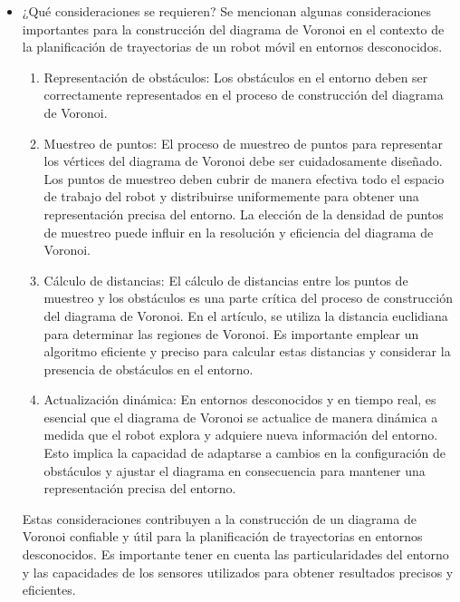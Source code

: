 \documentclass{article}
\begin{document}
\begin{itemize}
\item ¿Qué consideraciones se requieren?
  Se mencionan algunas consideraciones importantes para la construcción del diagrama de Voronoi en el contexto de la planificación de trayectorias de un robot móvil en entornos desconocidos.

  \begin{enumerate}
  
  \item Representación de obstáculos: Los obstáculos en el entorno deben ser correctamente representados en el proceso de construcción del diagrama de Voronoi. 
  \item Muestreo de puntos: El proceso de muestreo de puntos para representar los vértices del diagrama de Voronoi debe ser cuidadosamente diseñado. Los puntos de muestreo deben cubrir de manera efectiva todo el espacio de trabajo del robot y distribuirse uniformemente para obtener una representación precisa del entorno. La elección de la densidad de puntos de muestreo puede influir en la resolución y eficiencia del diagrama de Voronoi.
  \item Cálculo de distancias: El cálculo de distancias entre los puntos de muestreo y los obstáculos es una parte crítica del proceso de construcción del diagrama de Voronoi. En el artículo, se utiliza la distancia euclidiana para determinar las regiones de Voronoi. Es importante emplear un algoritmo eficiente y preciso para calcular estas distancias y considerar la presencia de obstáculos en el entorno.
  \item Actualización dinámica: En entornos desconocidos y en tiempo real, es esencial que el diagrama de Voronoi se actualice de manera dinámica a medida que el robot explora y adquiere nueva información del entorno. Esto implica la capacidad de adaptarse a cambios en la configuración de obstáculos y ajustar el diagrama en consecuencia para mantener una representación precisa del entorno.
  \end{enumerate}

  Estas consideraciones contribuyen a la construcción de un diagrama de Voronoi confiable y útil para la planificación de trayectorias en entornos desconocidos. Es importante tener en cuenta las particularidades del entorno y las capacidades de los sensores utilizados para obtener resultados precisos y eficientes.
  
\end{itemize}
\end{document}
